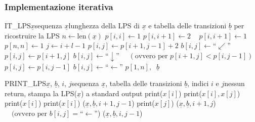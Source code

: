 \subsubsection*{Implementazione iterativa}
\vspace{-7pt}
\begin{algo}{IT\_LPS}{$\underline{x}$}{sequenza $\underline{x}$}{lunghezza della LPS di $\underline{x}$ e tabella delle transizioni $\underline{b}$ per ricostruire la LPS}
	\State \(n \gets \text{len}(\underline{x})\)
	 
		\State \(p[i, i] \gets 1\)
		 \(p[i, i+1] \gets 2\)
		\Else ~ \(p[i, i+1] \gets 1\) \EndIf
	\EndFor
	\State \(p[n,n] \gets 1\)
	\State
	 
			\State \(j \gets i + l - 1\)
				\State \(p[i, j] \gets p[i+1, j-1] + 2\)
				\State \(b[i, j] \gets \text{``} \swarrow \text{''}\)
				\State \(p[i, j] \gets p[i+1, j]\)
				\State \(b[i, j] \gets \text{``} \downarrow \text{''}\)
			\Else \(\quad (\text{ovvero per } p[i+1, j] < p[i, j-1])\)
				\State \(p[i, j] \gets p[i, j-1]\)
				\State \(b[i, j] \gets \text{``} \leftarrow \text{''}\)
			\EndIf
		\EndFor
	\EndFor
	\State \Return \(p[1, n], \;\; \underline{b}\)
\end{algo}

\begin{algo}{PRINT\_LPS}{$\underline{x}$, $\underline{b}$, $i$, $j$}{sequenza $\underline{x}$, tabella delle transizioni $\underline{b}$, indici $i$ e $j$}{nessun return, stampa la LPS($\underline{x}$) a standard output}
	 print(\(x[i]\))  \EndIf
	 
		 print(\(x[i], x[j]\))
		\Else ~ print(\(x[i]\)) \EndIf
	\EndIf
	\State
	 
		\State print(\(x[i]\))
		\State {}(\(\underline{x}, \underline{b}, i+1, j-1\))
		\State print(\(x[j]\))
	 
		\State {}(\(\underline{x}, \underline{b}, i+1, j\))
	\Else \(\quad (\text{ovvero per }b[i, j] = \text{``}\leftarrow\text{''}\)) 
		\State {}(\(\underline{x}, \underline{b}, i, j-1\))
	\EndIf
\end{algo}
